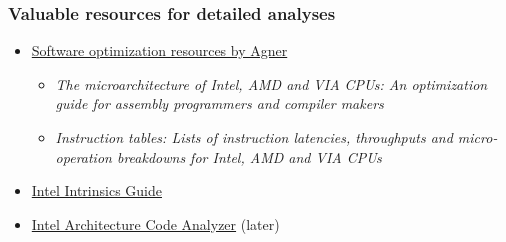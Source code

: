 \documentclass[12pt,dvipdfmx]{beamer}
\begin{document}
\begin{frame}[fragile]
  \frametitle{Valuable resources for detailed analyses}
  \begin{itemize}
  \item \href{http://www.agner.org/optimize/}{Software optimization resources by Agner}
    \begin{itemize}
    \item {\it The microarchitecture of Intel, AMD and VIA CPUs: An optimization guide for assembly programmers and compiler makers}
    \item {\it Instruction tables: Lists of instruction latencies, throughputs and micro-operation breakdowns for Intel, AMD and VIA CPUs}
    \end{itemize}
  \item \href{https://software.intel.com/sites/landingpage/IntrinsicsGuide/}{Intel Intrinsics Guide}
  \item \href{https://software.intel.com/en-us/articles/intel-architecture-code-analyzer}{Intel Architecture Code Analyzer} (later)
  \end{itemize}
\end{frame}
\end{document}
